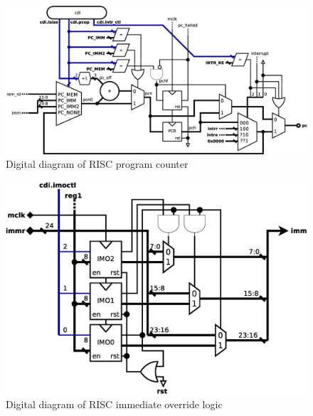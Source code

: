 \documentclass[a4paper,12pt]{article}
\begin{document}
\begin{figure}[hb!]
	\centering
	\includegraphics[width=\columnwidth]{graphics/program_counter.eps}
	\caption{Digital diagram of RISC program counter}
	\label{fig:program_counter}
\end{figure}

\pagebreak
	
\begin{figure}[ht!]
	\centering
	\includegraphics[scale=0.4]{graphics/imo.eps}
	\caption{Digital diagram of RISC immediate override logic}
	\label{fig:imo}
\end{figure}
\end{document}
